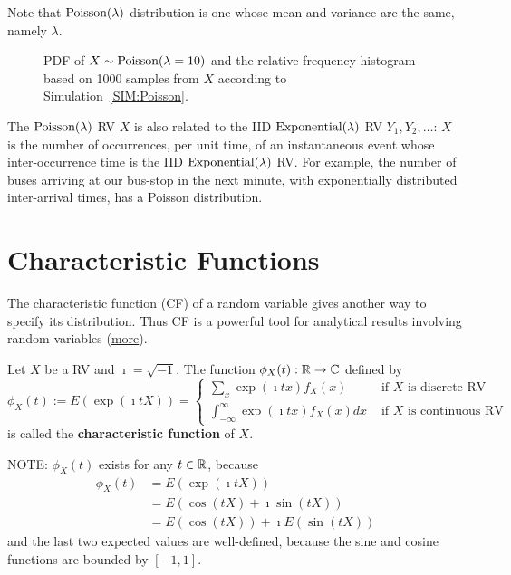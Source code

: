 Note that $\mbox{{\rm Poisson}}(\lambda)$ distribution is one whose mean and variance are the same, namely $\lambda$.

\begin{figure}[htpb]
\caption{PDF of $X \sim \mbox{{\rm Poisson}}(\lambda=10)$ and the relative frequency histogram based on 1000 samples from $X$ according to Simulation~\ref{SIM:Poisson}.\label{F:PlotPdfSim1000HistPoiss10}}
\centering   {}
\end{figure}

The $\mbox{{\rm Poisson}}(\lambda)$ RV $X$ is also related to the IID $\mbox{{\rm Exponential}}(\lambda)$ RV $Y_1,Y_2,\ldots$: $X$ is the number of occurrences, per unit time, of an instantaneous event whose inter-occurrence time is the IID $\mbox{{\rm Exponential}}(\lambda)$ RV.  For example, the number of buses arriving at our bus-stop in the next minute, with exponentially distributed inter-arrival times, has a Poisson distribution.

\section{Characteristic Functions}
The characteristic function (CF) of a random variable gives another way to specify its distribution. 
Thus CF is a powerful tool for analytical results involving random variables
(\href{http://en.wikipedia.org/wiki/Characteristic_function_(probability_theory)}{more}).

\begin{definition}
Let $X$ be a RV and $\imath=\sqrt{-1}$. The function $\phi_X(t) : \mathbb{R} \to \mathbb{C}$ defined by
\begin{equation}\label{E:CF}
\boxed{
\phi_X(t) := E \left( \exp \left( \imath t X\right) \right) = 
\begin{cases}
\sum_{x} \exp \left( \imath t x\right) f_X(x) & \text{ if $X$ is discrete RV}\\
\int_{-\infty}^{\infty} \exp \left( \imath t x\right) f_X(x) dx & \text{ if $X$ is continuous RV}
\end{cases}
}
\end{equation}
is called the {\bf characteristic function} of $X$.
\end{definition}

NOTE: 
$\phi_X(t)$ exists for any $t \in \mathbb{R}$, because
\begin{align*}
\phi_X(t) 
&= E \left( \exp \left( \imath t X\right) \right) \\
&= E \left( \cos(tX)+ \imath \sin(tX) \right)\\
&= E \left( \cos(tX) \right) + \imath E \left(\sin(tX) \right)
\end{align*}
and the last two expected values are well-defined, because the sine and cosine functions are bounded by $[-1,1]$.

